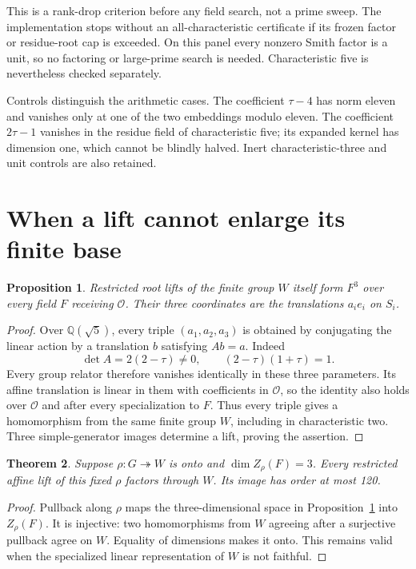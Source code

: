 \documentclass[11pt]{article}
\newtheorem{theorem}{Theorem}
\newtheorem{proposition}[theorem]{Proposition}
\newcommand{\OO}{\mathcal O}
\begin{document}
This is a rank-drop criterion before any field search, not a prime
sweep. The implementation stops without an all-characteristic
certificate if its frozen factor or residue-root cap is exceeded.
On this panel every nonzero Smith factor is a unit, so no factoring
or large-prime search is needed. Characteristic five is nevertheless
checked separately.

Controls distinguish the arithmetic cases. The coefficient $\tau-4$
has norm eleven and vanishes only at one of the two embeddings
modulo eleven. The coefficient $2\tau-1$ vanishes in the residue
field of characteristic five; its expanded kernel has dimension one,
which cannot be blindly halved. Inert characteristic-three and unit
controls are also retained.

\section{When a lift cannot enlarge its finite base}

\begin{proposition}\label{prop:universal}
Restricted root lifts of the finite group $W$ itself form $F^3$ over
every field $F$ receiving $\OO$. Their three coordinates are the
translations $a_i e_i$ on $S_i$.
\end{proposition}
\begin{proof}
Over $\mathbb Q(\sqrt5)$, every triple $(a_1,a_2,a_3)$ is obtained by
conjugating the linear action by a translation $b$ satisfying $Ab=a$.
Indeed
\[
            \det A=2(2-\tau)\ne0,\qquad (2-\tau)(1+\tau)=1.
\]
Every group relator therefore vanishes identically in these three
parameters. Its affine translation is linear in them with coefficients
in $\OO$, so the identity also holds over $\OO$ and after every
specialization to $F$. Thus every triple gives a homomorphism from
the same finite group $W$, including in characteristic two. Three
simple-generator images determine a lift, proving the assertion.
\end{proof}

\begin{theorem}\label{thm:factor}
Suppose $\rho:G\twoheadrightarrow W$ is onto and
$\dim Z_\rho(F)=3$. Every restricted affine lift of this fixed $\rho$
factors through $W$. Its image has order at most 120.
\end{theorem}
\begin{proof}
Pullback along $\rho$ maps the three-dimensional space in
Proposition~\ref{prop:universal} into $Z_\rho(F)$. It is injective:
two homomorphisms from $W$ agreeing after a surjective pullback agree
on $W$. Equality of dimensions makes it onto. This remains valid
when the specialized linear representation of $W$ is not faithful.
\end{proof}
\end{document}
